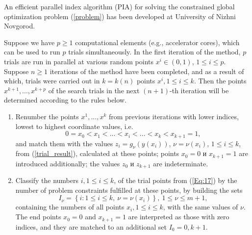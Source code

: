 \documentclass{llncs}
\begin{document}
An efficient parallel index algorithm (PIA) for solving the constrained global optimization problem (\ref{problem}) has been developed at University of Nizhni Novgorod. 

Suppose we have $p \geq 1$  computational elements (e.g., accelerator cores), which can be used to run $p$ trials simultaneously. In the first iteration of the method, $p$ trials are run in parallel at various random points $x^i\in(0,1)$, $1\leq i \leq p$. 
Suppose $n \geq 1$  iterations of the method have been completed, and as a result of which, trials were carried out in $k=k(n)$ points $x^i, 1\leq i \leq k$. Then the points $x^{k+1},...,x^{k+p}$  of the search trials in the next $(n+1)$-th iteration will be determined according to the rules below.

\begin{enumerate}
\item 
Renumber the points $x^1,...,x^k$ from previous iterations with lower indices, lowest to highest coordinate values, i.e.
\begin{equation}\label{Eq:17}
0=x_0<x_1<...<x_i<...<x_k<x_{k+1}=1,
\end{equation}
and match them with the values $z_i=g_\nu(y(x_i))$, $\nu=\nu(x_i)$, $1 \leq i \leq k$, from (\ref{trial_result}), calculated at these points; points $x_0=0$ и $x_{k+1}=1$ are introduced additionally; the values $z_0$ и $z_{k+1}$ are indeterminate.
\item
Classify the numbers $i,1\leq i \leq k$, of the trial points from (\ref{Eq:17}) by the number of problem constraints fulfilled at these points, by building the sets
\begin{equation}\label{Eq:18}
I_\nu = \left\{i: 1 \leq i \leq k,\ \nu = \nu(x_i)\right\},\ 1 \leq \nu \leq m+1,
\end{equation}
containing the numbers of all points $x_i,1\leq i \leq k$, with the same values of $\nu$. The end points $x_0=0$ and $x_{k+1}=1$ are interpreted as those with zero indices, and they are matched to an additional set $I_0={0,k+1}$. 


\end{enumerate}
\end{document}
